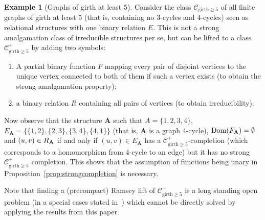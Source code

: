 \documentclass{elsarticle}
\def\dom{\mathop{\mathrm{Dom}}\nolimits}
\def\str#1{\mathbf {#1}}
\def\nbrel#1#2{R\ifstrempty{#1}{}{_{#1}}\ifstrempty{#2}{}{^{#2}}}
\def\rel#1#2{\nbrel{\ifstrempty{#1}{}{\str{#1}}}{#2}}
\def\func#1#2{\nbfunc{\ifstrempty{#1}{}{\str{#1}}}{#2}}
\def\nbfunc#1#2{F\ifstrempty{#1}{}{_{#1}}\ifstrempty{#2}{}{^{#2}}}
\theoremstyle{plain}
\theoremstyle{definition}
\newtheorem{example}[theorem]{Example}
\theoremstyle{remark}
\begin{document}
\begin{example}[Graphs of girth at least 5]
\label{example:C4}
Consider the class $\mathcal C_{\mathrm{girth}\geq 5}$ of all finite graphs of girth at least 5 (that is, containing no 3-cycles and 4-cycles) seen as relational structures with one binary relation $E$.
This is not a strong amalgamation class of irreducible structures per se, but
can be lifted to a class $\mathcal C^+_{\mathrm{girth}\geq 5}$ by
adding two symbols:
\begin{enumerate}
\item A partial binary function $F$ mapping every pair of disjoint
vertices to the unique vertex connected to both of them if such a vertex
exists (to obtain the strong amalgamation property);
\item a binary relation $R$ containing all pairs of vertices (to obtain irreducibility).
\end{enumerate}

Now observe that the structure $\str{A}$ such that $A=\{1,2,3,4\}$, $E_\str{A} = \{\{1,2\},\allowbreak \{2,3\},\allowbreak \{3,4\},\allowbreak \{4,1\}\}$ (that is, $\str A$ is a graph 4-cycle), $\dom(\func{A}{})=\emptyset$ and $(u,v)\in \rel{A}{}$ if and only if $(u,v)\in E_\str{A}$
 has a $\mathcal C^+_{\mathrm{girth}\geq 5}$-completion (which corresponds to a homomorphism from 4-cycle to an edge) but it has
no strong $\mathcal C^+_{\mathrm{girth}\geq 5}$ completion.  This shows that the assumption of functions being unary
in Proposition~\ref{prop:strongcompletion} is necessary. 

Note that finding a (precompact) Ramsey lift of $\mathcal C^+_{\mathrm{girth}\geq 5}$ is a long standing open
problem (in a special cases stated in~\cite{Nevsetvril1987, Nevsetvril1995})
which cannot be directly solved by applying the results from this paper.
\end{example}
\end{document}
